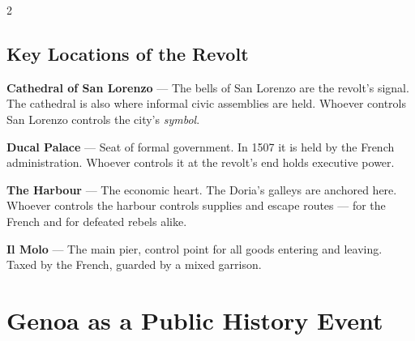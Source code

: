 \begin{multicols}{2}

\subsection{Key Locations of the Revolt}


\textbf{Cathedral of San Lorenzo} --- The bells of San Lorenzo are the
revolt's signal. The cathedral is also where informal civic assemblies
are held. Whoever controls San Lorenzo controls the city's \textit{symbol}.


\textbf{Ducal Palace} --- Seat of formal government. In 1507 it is held
by the French administration. Whoever controls it at the revolt's end
holds executive power.

\columnbreak


\textbf{The Harbour} --- The economic heart. The Doria's galleys are
anchored here. Whoever controls the harbour controls supplies and
escape routes --- for the French and for defeated rebels alike.


\textbf{Il Molo} --- The main pier, control point for all goods entering
and leaving. Taxed by the French, guarded by a mixed garrison.

\end{multicols}

\section{Genoa as a Public History Event}
\label{sec:public-history}

